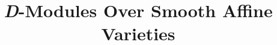 
\usepackage{indentfirst}

\title{\textit{D}-Modules Over Smooth Affine Varieties}
\date{}

\usepackage{titling}
\renewcommand\maketitlehooka{\null\mbox{}\vfill}
\renewcommand\maketitlehookd{\vfill\null}

\setcounter{page}{2}
\maketitle

\newpage

\tableofcontents

\newpage
\printbibliography

